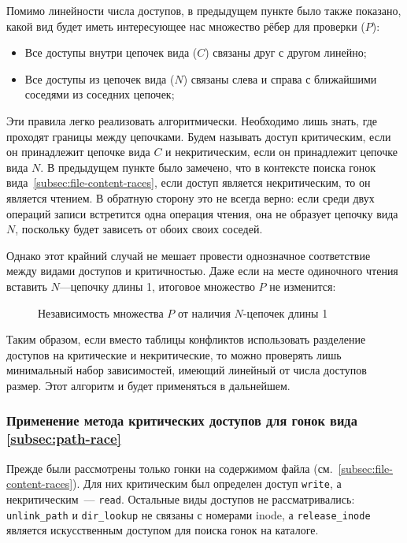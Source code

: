 Помимо линейности числа доступов, в предыдущем пункте было также показано, какой вид будет иметь интересующее нас множество рёбер для проверки ($P$):

\begin{itemize}
    \item Все доступы внутри цепочек вида ($C$) связаны друг с другом линейно;
    \item Все доступы из цепочек вида ($N$) связаны слева и справа с ближайшими соседями из соседних цепочек;
\end{itemize}

Эти правила легко реализовать алгоритмически. Необходимо лишь знать, где проходят границы между цепочками. Будем называть доступ критическим, если он принадлежит цепочке вида $C$ и некритическим, если он принадлежит цепочке вида $N$. В предыдущем пункте было замечено, что в контексте поиска гонок вида~\ref{subsec:file-content-races}, если доступ является некритическим, то он является чтением. В обратную сторону это не всегда верно: если среди двух операций записи встретится одна операция чтения, она не образует цепочку вида $N$, поскольку будет зависеть от обоих своих соседей.

Однако этот крайний случай не мешает провести однозначное соответствие между видами доступов и критичностью. Даже если на месте одиночного чтения вставить $N$---цепочку длины 1, итоговое множество $P$ не изменится:

\begin{figure}[H]
    \centering
    
    \caption{Независимость множества $P$ от наличия $N$-цепочек длины 1}
    \label{fig:short-n-chain}
\end{figure}

Таким образом, если вместо таблицы конфликтов использовать разделение доступов на критические и некритические, то можно проверять лишь минимальный набор зависимостей, имеющий линейный от числа доступов размер. Этот алгоритм и будет применяться в дальнейшем.

\subsubsection{Применение метода критических доступов для гонок вида \ref{subsec:path-race}}

Прежде были рассмотрены только гонки на содержимом файла (см.~\ref{subsec:file-content-races}). Для них критическим был определен доступ \texttt{write}, а некритическим~--- \texttt{read}. Остальные виды доступов не рассматривались: \texttt{unlink\_path} и \texttt{dir\_lookup} не связаны с номерами inode, а \texttt{release\_inode} является искусственным доступом для поиска гонок на каталоге.

